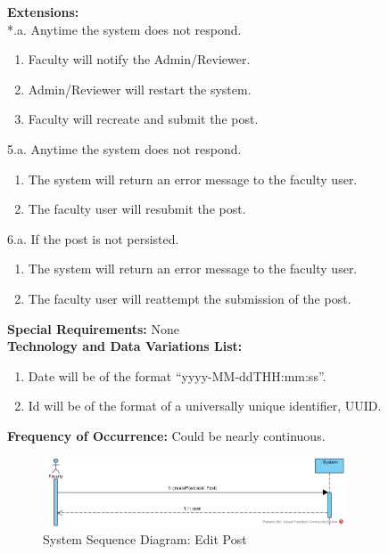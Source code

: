 \textbf{Extensions:} \\\relax
*.a. Anytime the system does not respond.
\begin{enumerate}
    \item Faculty will notify the Admin/Reviewer.
    \item Admin/Reviewer will restart the system.
    \item Faculty will recreate and submit the post.
\end{enumerate}
5.a. Anytime the system does not respond.
\begin{enumerate}
    \item The system will return an error message to the faculty user.
    \item The faculty user will resubmit the post.
\end{enumerate}
6.a. If the post is not persisted.
\begin{enumerate}
    \item The system will return an error message to the faculty user.
    \item The faculty user will reattempt the submission of the post.
\end{enumerate}
\textbf{Special Requirements:} None \\
\textbf{Technology and Data Variations List: }
\begin{enumerate}
    \item Date will be of the format “yyyy-MM-ddTHH:mm:ss”.
    \item Id will be of the format of a universally unique identifier, UUID.
\end{enumerate}
\textbf{Frequency of Occurrence:} Could be nearly continuous. \\

\begin{figure}[H]
    \centering
    \includegraphics[width=0.8\textwidth]{images/SSD-UC10-CreatePost.png}
    \centering
    \caption{System Sequence Diagram: Edit Post}
\end{figure}